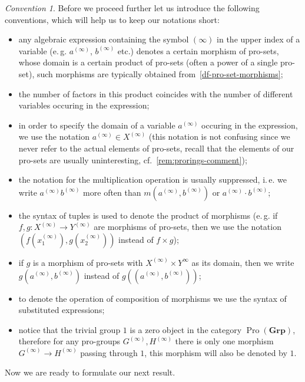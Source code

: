 \documentclass{article}
\theoremstyle{definition}
\theoremstyle{remark}
\newtheorem{conv}[lemma]{Convention} \Crefname{conv}{Convention}{Conventions}
\DeclareMathOperator{\Pro}{Pro}
\newcommand{\Group}{\mathbf{Grp}}
\begin{document}
\begin{conv} \label{conv:notation}
Before we proceed further let us introduce the following conventions, 
 which will help us to keep our notations short:
 \begin{itemize}
  \item any algebraic expression containing the symbol $(\infty)$ in the upper index of a variable (e.\,g. $a^{(\infty)}$, $b^{(\infty)}$ etc.) denotes a certain morphism of pro-sets, whose domain is a certain product of pro-sets (often a power of a single pro-set), such morphisms are typically obtained from~\cref{df-pro-set-morphisms};
  \item the number of factors in this product coincides with the number of different variables occuring in the expression;
  \item in order to specify the domain of a variable $a^{(\infty)}$ occuring in the expression, we use the notation $a^{(\infty)} \in X^{(\infty)}$ (this notation is not confusing since we never refer to the actual elements of pro-sets, recall that the elements of our pro-sets are usually uninteresting, cf.~\cref{rem:prorings-comment});
  \item the notation for the multiplication operation is usually suppressed, i.\,e. we write $a^{(\infty)} b^{(\infty)}$ more often than $m(a^{(\infty)}, b^{(\infty)})$ or $a^{(\infty)} \cdot b^{(\infty)}$;
  \item the syntax of tuples is used to denote the product of morphisms (e.\,g. if $f,g \colon X^{(\infty)} \to Y^{(\infty)}$ are morphisms of pro-sets, then we use the notation $(f(x_1^{(\infty)}), g(x_2^{(\infty)}))$ instead of $f\times g$);
  \item if $g$ is a morphism of pro-sets with $X^{(\infty)} \times Y^{\infty}$ as its domain, then we write $g(a^{(\infty)}, b^{(\infty)})$ instead of $g((a^{(\infty)}, b^{(\infty)}))$;
  \item to denote the operation of composition of morphisms we use the syntax of substituted expressions;
  \item notice that the trivial group $1$ is a zero object in the category $\Pro(\Group)$, therefore for any pro-groups $G^{(\infty)}, H^{(\infty)}$
   there is only one morphism $G^{(\infty)} \to H^{(\infty)}$ passing through $1$, this morphism will also be denoted by $1$.
 \end{itemize}
\end{conv} 
Now we are ready to formulate our next result.
\end{document}
